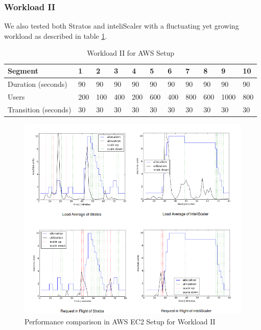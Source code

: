 \pagebreak

\subsubsection{Workload II}
We also tested both Stratos and inteliScaler with a fluctuating yet growing workload as described in table \ref{table:workload_5}.
\begin{table}[h!]
\centering
\caption{Workload II for AWS Setup}
\label{table:workload_5}
\begin{tabular}{|l|l|l|l|l|l|l|l|l|l|l|}
\hline
Segment & 1 & 2 & 3 & 4 & 5 & 6 & 7 & 8 & 9 & 10\\ \hline
Duration (seconds) & 90 & 90 & 90 & 90 & 90 & 90 & 90 & 90 & 90 & 90 \\ \hline
Users & 200 & 100 & 400 & 200 & 600 & 400 & 800 & 600 & 1000 & 800   \\ \hline
Transition (seconds) & 30 & 30 & 30 & 30 & 30 & 30 & 30 & 30 & 30 & 30  \\ \hline
\end{tabular}
\end{table}
\begin{figure}[h!]
\centering
\includegraphics[width=500px]{figures/results_workload_5}
\caption{Performance comparison in AWS EC2 Setup for Workload II}
\label{graph:workload_5}
\end{figure}



